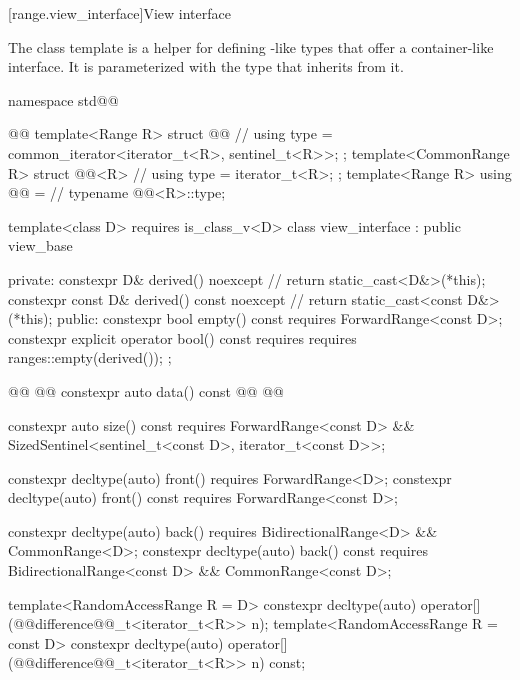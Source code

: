 {[range.view_interface]{View interface}

\pnum
The class template  is a helper for defining
-like types that offer a container-like interface. It is
parameterized with the type that inherits from it.

%
\begin{codeblock}
namespace std@@ { @@
  template<Range R>
  struct @@ { // \expos
    using type = common_iterator<iterator_t<R>, sentinel_t<R>>;
  };
  template<CommonRange R>
  struct @@<R> { // \expos
    using type = iterator_t<R>;
  };
  template<Range R>
    using @@ = // \expos
      typename @@<R>::type;

  template<class D>
    requires is_class_v<D>
  class view_interface : public view_base {
  private:
    constexpr D& derived() noexcept { // \expos
      return static_cast<D&>(*this);
    }
    constexpr const D& derived() const noexcept { // \expos
      return static_cast<const D&>(*this);
    }
  public:
    constexpr bool empty() const requires ForwardRange<const D>;
    constexpr explicit operator bool() const
      requires requires { ranges::empty(derived()); };

    @@
      @@
    constexpr auto data() const
      @@
      @@

    constexpr auto size() const requires ForwardRange<const D> &&
      SizedSentinel<sentinel_t<const D>, iterator_t<const D>>;

    constexpr decltype(auto) front() requires ForwardRange<D>;
    constexpr decltype(auto) front() const requires ForwardRange<const D>;

    constexpr decltype(auto) back()
      requires BidirectionalRange<D> && CommonRange<D>;
    constexpr decltype(auto) back() const
      requires BidirectionalRange<const D> && CommonRange<const D>;

    template<RandomAccessRange R = D>
      constexpr decltype(auto) operator[](@@difference@@_t<iterator_t<R>> n);
    template<RandomAccessRange R = const D>
      constexpr decltype(auto) operator[](@@difference@@_t<iterator_t<R>> n) const;

}}
\end{codeblock}}
